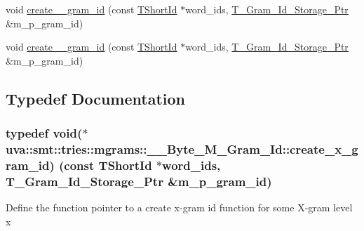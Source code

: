 \begin{DoxyCompactItemize}
\item 
void \hyperlink{namespaceuva_1_1smt_1_1tries_1_1mgrams_1_1_____byte___m___gram___id_aeff6d7ea13ed543303d3a907696b36a3}{create\+\_\+\_\+gram\+\_\+id} (const \hyperlink{namespaceuva_1_1smt_1_1hashing_adcf22e1982ad09d3a63494c006267469}{T\+Short\+Id} $\ast$word\+\_\+ids, \hyperlink{namespaceuva_1_1smt_1_1tries_1_1mgrams_1_1_m___gram___id_a478e6468dbd5dab37599c566d77c845c}{T\+\_\+\+Gram\+\_\+\+Id\+\_\+\+Storage\+\_\+\+Ptr} \&m\+\_\+p\+\_\+gram\+\_\+id)
\item 
void \hyperlink{namespaceuva_1_1smt_1_1tries_1_1mgrams_1_1_____byte___m___gram___id_a8bd54296799fa57273d43f0b3f97097e}{create\+\_\+\_\+gram\+\_\+id} (const \hyperlink{namespaceuva_1_1smt_1_1hashing_adcf22e1982ad09d3a63494c006267469}{T\+Short\+Id} $\ast$word\+\_\+ids, \hyperlink{namespaceuva_1_1smt_1_1tries_1_1mgrams_1_1_m___gram___id_a478e6468dbd5dab37599c566d77c845c}{T\+\_\+\+Gram\+\_\+\+Id\+\_\+\+Storage\+\_\+\+Ptr} \&m\+\_\+p\+\_\+gram\+\_\+id)
\end{DoxyCompactItemize}


\subsection{Typedef Documentation}
\hypertarget{namespaceuva_1_1smt_1_1tries_1_1mgrams_1_1_____byte___m___gram___id_a1c1aae2c6557d3d99cd055f0d41ba4a6}{}
\subsubsection[{create\+\_\+x\+\_\+gram\+\_\+id}]{\setlength{\rightskip}{0pt plus 5cm}typedef void($\ast$ uva\+::smt\+::tries\+::mgrams\+::\+\_\+\+\_\+\+Byte\+\_\+\+M\+\_\+\+Gram\+\_\+\+Id\+::create\+\_\+x\+\_\+gram\+\_\+id) (const {\bf T\+Short\+Id} $\ast$word\+\_\+ids, {\bf T\+\_\+\+Gram\+\_\+\+Id\+\_\+\+Storage\+\_\+\+Ptr} \&m\+\_\+p\+\_\+gram\+\_\+id)}\label{namespaceuva_1_1smt_1_1tries_1_1mgrams_1_1_____byte___m___gram___id_a1c1aae2c6557d3d99cd055f0d41ba4a6}
Define the function pointer to a create x-\/gram id function for some X-\/gram level x \hypertarget{namespaceuva_1_1smt_1_1tries_1_1mgrams_1_1_____byte___m___gram___id_a9a549c7e7bb18c13c4a8f8af3f39e426}{}
